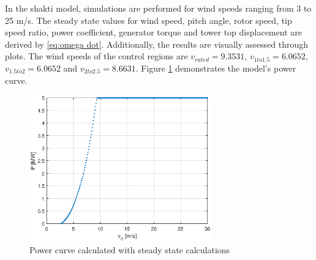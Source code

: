 In the \gls{shakti} model, simulations are performed for wind speeds ranging from 3 to 25 m/s.
The steady state values for wind speed, pitch angle, rotor speed, tip speed ratio, power coefficient, generator torque and tower top displacement are derived by \ref{eq:omega dot}.
Additionally, the results are visually assessed through plots.
The wind speeds of the control regions are $v_{rated} = 9.3531$, $v_{1to1.5} = 6.0652$, $v_{1.5to2} = 6.0652$ and $v_{2to2.5} = 8.6631$. Figure \ref{fig:power cureve} demonstrates the model's power curve.

\begin{figure}[h]
	\centering
	\includegraphics[width=0.7\textwidth]{Figures/P_Vs_v.eps}
	\caption{Power curve calculated with steady state calculations}
	\label{fig:power cureve} 
\end{figure}

